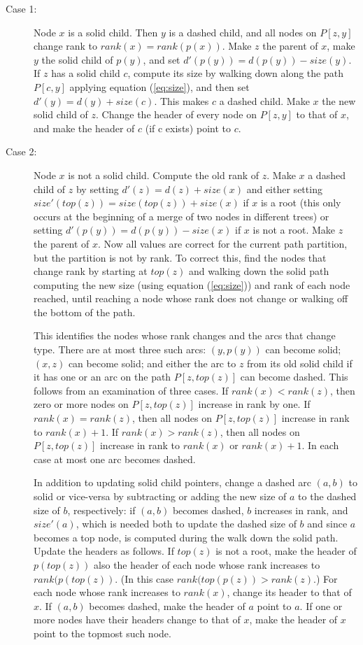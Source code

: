 \documentclass[twoside,leqno,twocolumn]{article}
\newcommand{\rank}{\mathit{rank}}
\newcommand{\size}{\mathit{size}}
\newcommand{\topn}{\mathit{top}}
\begin{document}
\begin{description}
\item[Case 1:] Node $x$ is a solid child.  Then $y$ is a dashed child, and all nodes on $P[z, y]$ change rank to $\rank(x) = \rank(p(x))$.  Make $z$ the parent of $x$, make $y$ the solid child of $p(y)$, and set $d'(p(y)) = d(p(y)) - \size(y)$.  If $z$ has a solid child $c$, compute its size by walking down along the path $P[c, y]$ applying equation (\ref{eq:size}), and then set $d'(y) = d(y) + \size(c)$.  This makes $c$ a dashed child.   Make $x$ the new solid child of $z$.  Change the header of every node on $P[z, y]$ to that of $x$, and make the header of $c$ (if c exists) point to $c$. 

\item[Case 2:] Node $x$ is not a solid child.  Compute the old rank of $z$.   Make $x$ a dashed child of $z$ by setting $d'(z) = d(z) + \size(x)$ and either setting $size'(\topn(z)) = \size(\topn(z)) + \size(x)$ if $x$ is a root (this only occurs at the beginning of a merge of two nodes in different trees) or setting $d'(p(y)) = d(p(y)) - \size(x)$ if $x$ is not a root.  Make $z$ the parent of $x$.  Now all values are correct for the current path partition, but the partition is not by rank.  To correct this, find the nodes that change rank by starting at $\topn(z)$ and walking down the solid path computing the new size (using equation (\ref{eq:size})) and rank of each node reached, until reaching a node whose rank does not change or walking off the bottom of the path.

    This identifies the nodes whose rank changes and the arcs that change type.  There are at most three such arcs: $(y, p(y))$ can become solid; $(x, z)$ can become solid; and either the arc to $z$ from its old solid child if it has one or an arc on the path $P[z, \topn(z)]$ can become dashed.  This follows from an examination of three cases.  If $\rank(x) < \rank(z)$, then zero or more nodes on $P[z, \topn(z)]$ increase in rank by one.  If $\rank(x) = \rank(z)$, then all nodes on $P[z, \topn(z)]$ increase in rank to $\rank(x) + 1$.  If $\rank(x) > \rank(z)$, then all nodes on $P[z, \topn(z)]$ increase in rank to $\rank(x)$ or $\rank(x) + 1$.  In each case at most one arc becomes dashed.

    In addition to updating solid child pointers, change a dashed arc $(a, b)$ to solid or vice-versa by subtracting or adding the new size of $a$ to the dashed size of $b$, respectively: if $(a, b)$ becomes dashed, $b$ increases in rank, and $\size'(a)$, which is needed both to update the dashed size of $b$ and since $a$ becomes a top node, is computed during the walk down the solid path.  Update the headers as follows.  If $\topn(z)$ is not a root, make the header of $p(\topn(z))$ also the header of each node whose rank increases to $\rank(p(\topn(z))$.  (In this case $\rank(\topn(p(z)) > \rank(z)$.)  For each node whose rank increases to $\rank(x)$, change its header to that of $x$.  If $(a, b)$ becomes dashed, make the header of $a$ point to $a$.  If one or more nodes have their headers change to that of $x$, make the header of $x$ point to the topmost such node. \end{description}
\end{document}
